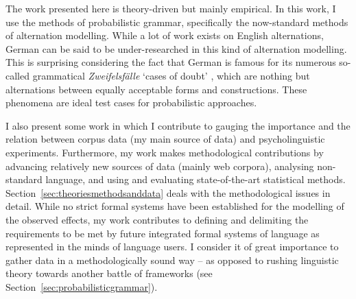\documentclass[a4paper, biblatex, charis, linguex]{glossa}
\begin{document}
The work presented here is theory-driven but mainly empirical.
In this work, I use the methods of probabilistic grammar, specifically the now-standard methods of alternation modelling.
While a lot of work exists on English alternations, German can be said to be under-researched in this kind of alternation modelling.
This is surprising considering the fact that German is famous for its numerous so-called grammatical \textit{Zweifelsfälle} `cases of doubt' \citep{Klein2009,Duden09}, which are nothing but alternations between equally acceptable forms and constructions.
These phenomena are ideal test cases for probabilistic approaches.

I also present some work in which I contribute to gauging the importance and the relation between corpus data (my main source of data) and psycholinguistic experiments.
Furthermore, my work makes methodological contributions by advancing relatively new sources of data (mainly web corpora), analysing non-standard language, and using and evaluating state-of-the-art statistical methods.
Section~\ref{sec:theoriesmethodsanddata} deals with the methodological issues in detail.
While no strict formal systems have been established for the modelling of the observed effects, my work contributes to defining and delimiting the requirements to be met by future integrated formal systems of language as represented in the minds of language users.
I consider it of great importance to gather data in a methodologically sound way -- as opposed to rushing linguistic theory towards another battle of frameworks (see Section~\ref{sec:probabilisticgrammar}).
\end{document}
